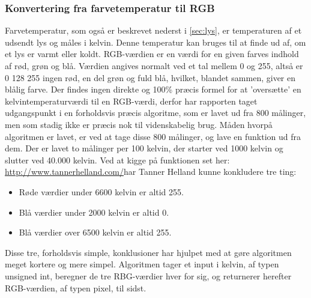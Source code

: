 \subsubsection{Konvertering fra farvetemperatur til RGB}
Farvetemperatur, som også er beskrevet nederst i \ref{sec:lys}, er temperaturen af et udsendt lys og måles i kelvin. Denne temperatur kan bruges til at finde ud af, om et lys er varmt eller koldt. 
RGB-værdien er en værdi for en given farves indhold af rød, grøn og blå. Værdien angives normalt ved et tal mellem 0 og 255, altså er 0 128 255 ingen rød, en del grøn og fuld blå, hvilket, blandet sammen, giver en blålig farve.
Der findes ingen direkte og 100\% præcis formel for at ’oversætte’ en kelvintemperaturværdi til en RGB-værdi, derfor har rapporten taget udgangspunkt i en forholdsvis præcis algoritme, som er lavet ud fra 800 målinger, men som stadig ikke er præcis nok til videnskabelig brug.
Måden hvorpå algoritmen er lavet, er ved at tage disse 800 målinger, og lave en funktion ud fra dem. Der er lavet to målinger per 100 kelvin, der starter ved 1000 kelvin og slutter ved 40.000 kelvin. Ved at kigge på funktionen set her: \href{http://www.tannerhelland.com/4435/convert-temperature-rgb-algorithm-code/raw_temperature_vs_rgb_chart/}{http://www.tannerhelland.com/}har Tanner Helland  kunne konkludere  tre ting:

\begin{itemize}
\item Røde værdier under 6600 kelvin er altid 255.
\item Blå værdier under 2000 kelvin er altid 0.
\item Blå værdier over 6500 kelvin er altid 255.
\end{itemize}

Disse tre, forholdsvis simple, konklusioner har hjulpet med at gøre algoritmen meget kortere og mere simpel. Algoritmen tager et input i kelvin, af typen unsigned int, beregner de tre RBG-værdier hver for sig, og returnerer herefter RGB-værdien, af typen pixel, til sidst. 

